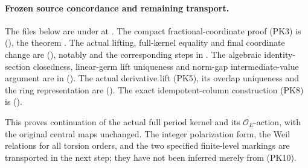 \paragraph{Frozen source concordance and remaining transport.}
The files below are under
at .
The compact fractional-coordinate proof (PK3) is
(),
the theorem .
The actual lifting, full-kernel equality and final
coordinate change are
(),
notably  and the corresponding
steps in .
The algebraic identity-section closedness, linear-germ
lift uniqueness and norm-gap intermediate-value argument
are in 
().
The actual derivative lift (PK5), its overlap uniqueness
and the ring representation are
().
The exact idempotent-column construction (PK8) is
().

This proves continuation of the actual full period kernel
and its \(\mathcal O_E\)-action, with the original central
maps unchanged.
The integer polarization form, the Weil relations for all
torsion orders, and the two specified finite-level markings
are transported in the next step; they have not been
inferred merely from (PK10).
